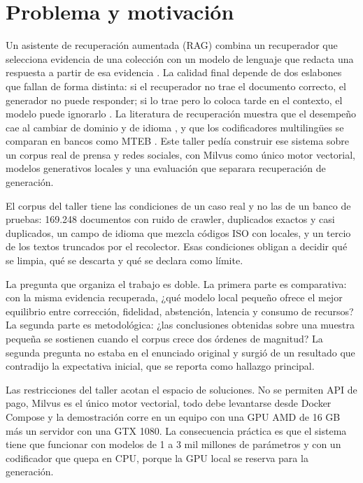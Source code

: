 \documentclass[11pt]{tg_usta}
\begin{document}
\section{Problema y motivación}

Un asistente de recuperación aumentada (RAG) combina un recuperador que selecciona evidencia de una colección con un modelo de lenguaje que redacta una respuesta a partir de esa evidencia \cite{lewis2020rag}. La calidad final depende de dos eslabones que fallan de forma distinta: si el recuperador no trae el documento correcto, el generador no puede responder; si lo trae pero lo coloca tarde en el contexto, el modelo puede ignorarlo \cite{liu2024lost}. La literatura de recuperación muestra que el desempeño cae al cambiar de dominio y de idioma \cite{thakur2021beir,zhang2023miracl}, y que los codificadores multilingües se comparan en bancos como MTEB \cite{muennighoff2023mteb}. Este taller pedía construir ese sistema sobre un corpus real de prensa y redes sociales, con Milvus como único motor vectorial, modelos generativos locales y una evaluación que separara recuperación de generación.

El corpus del taller tiene las condiciones de un caso real y no las de un banco de pruebas: 169.248 documentos con ruido de crawler, duplicados exactos y casi duplicados, un campo de idioma que mezcla códigos ISO con locales, y un tercio de los textos truncados por el recolector. Esas condiciones obligan a decidir qué se limpia, qué se descarta y qué se declara como límite.

La pregunta que organiza el trabajo es doble. La primera parte es comparativa: con la misma evidencia recuperada, ¿qué modelo local pequeño ofrece el mejor equilibrio entre corrección, fidelidad, abstención, latencia y consumo de recursos? La segunda parte es metodológica: ¿las conclusiones obtenidas sobre una muestra pequeña se sostienen cuando el corpus crece dos órdenes de magnitud? La segunda pregunta no estaba en el enunciado original y surgió de un resultado que contradijo la expectativa inicial, que se reporta como hallazgo principal.

Las restricciones del taller acotan el espacio de soluciones. No se permiten API de pago, Milvus es el único motor vectorial, todo debe levantarse desde Docker Compose y la demostración corre en un equipo con una GPU AMD de 16 GB más un servidor con una GTX 1080. La consecuencia práctica es que el sistema tiene que funcionar con modelos de 1 a 3 mil millones de parámetros y con un codificador que quepa en CPU, porque la GPU local se reserva para la generación.
\end{document}
